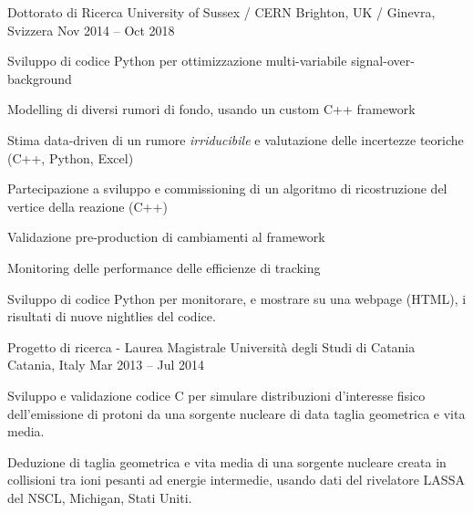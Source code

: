   \begin{cventries}    
    \cventry
    {Dottorato di Ricerca}
    {University of Sussex / CERN}
    {Brighton, UK / Ginevra, Svizzera}
    {Nov 2014 -- Oct 2018}
    {
    \begin{cvitems}
      \item Sviluppo di codice Python per ottimizzazione multi-variabile signal-over-background 
      \item Modelling di diversi rumori di fondo, usando un custom C++ framework
      \item Stima data-driven di un rumore \emph{irriducibile} e valutazione delle incertezze teoriche (C++, Python, Excel)
      \item Partecipazione a sviluppo e commissioning di un algoritmo di ricostruzione del vertice della reazione (C++)
      \item Validazione pre-production di cambiamenti al framework
      \item Monitoring delle performance delle efficienze di tracking
      \item Sviluppo di codice Python per monitorare, e mostrare su una webpage (HTML), i risultati di nuove nightlies del codice.
    \end{cvitems}
    }
  \end{cventries}

  \begin{cventries}    
    \cventry
    {Progetto di ricerca - Laurea Magistrale}
    {Università degli Studi di Catania}
    {Catania, Italy}
    {Mar 2013 -- Jul 2014}
    {
    \begin{cvitems}
      \item Sviluppo e validazione codice C per simulare distribuzioni d'interesse fisico dell'emissione di protoni da una sorgente nucleare di data taglia geometrica e vita media. 
      \item Deduzione di taglia geometrica e vita media di una sorgente nucleare creata in collisioni tra ioni pesanti ad energie intermedie, usando dati del rivelatore LASSA del NSCL, Michigan, Stati Uniti.
    \end{cvitems}
    }
  \end{cventries}